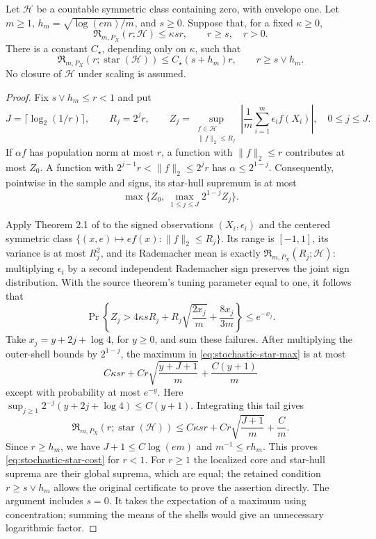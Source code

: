 \begin{lemma}
\label{lem:stochastic-star-cost}
Let $\mathcal H$ be a countable symmetric class containing zero, with
envelope one. Let $m\ge1$, $h_m=\sqrt{\log(em)/m}$, and $s\ge0$.
Suppose that, for a fixed $\kappa\ge0$,
\[
 \mathfrak R_{m,P_X}(r;\mathcal H)\le\kappa sr,
 \qquad r\ge s,\quad r>0.
\]
There is a constant $C_\star$, depending only on $\kappa$, such that
\begin{equation}
 \mathfrak R_{m,P_X}(r;\operatorname{star}(\mathcal H))
 \le C_\star(s+h_m)r,
 \qquad r\ge s\vee h_m.
 \label{eq:stochastic-star-cost}
\end{equation}
No closure of $\mathcal H$ under scaling is assumed.
\end{lemma}
\begin{proof}
Fix $s\vee h_m\le r<1$ and put
\[
 J=\lceil\log_2(1/r)\rceil,\qquad R_j=2^jr,
 \qquad
 Z_j=\sup_{\substack{f\in\mathcal H\\\|f\|_2\le R_j}}
 \left|\frac1m\sum_{i=1}^m\epsilon_i f(X_i)\right|,
 \quad 0\le j\le J.
\]
If $\alpha f$ has population norm at most $r$, a function with
$\|f\|_2\le r$ contributes at most $Z_0$. A function with
$2^{j-1}r<\|f\|_2\le2^jr$ has $\alpha\le2^{1-j}$.
Consequently, pointwise in the sample and signs, its star-hull
supremum is at most
\begin{equation}
 \max\{Z_0,\ \max_{1\le j\le J}2^{1-j}Z_j\}.
 \label{eq:stochastic-star-max}
\end{equation}

Apply Theorem 2.1 of \citet{bartlett2005local} to the signed
observations $(X_i,\epsilon_i)$ and the centered symmetric class
$\{(x,e)\mapsto ef(x):\|f\|_2\le R_j\}$. Its range is
$[-1,1]$, its variance is at most $R_j^2$, and its Rademacher mean
is exactly $\mathfrak R_{m,P_X}(R_j;\mathcal H)$: multiplying
$\epsilon_i$ by a second independent Rademacher sign preserves the
joint sign distribution. With the source theorem's tuning parameter
equal to one, it follows that
\[
 \Pr\left\{Z_j>4\kappa sR_j+
 R_j\sqrt{\frac{2x_j}{m}}+\frac{8x_j}{3m}\right\}
 \le e^{-x_j}.
\]
Take $x_j=y+2j+\log4$, for $y\ge0$, and sum these failures.
After multiplying the outer-shell bounds by $2^{1-j}$, the maximum
in \eqref{eq:stochastic-star-max} is at most
\[
 C\kappa sr+
 Cr\sqrt{\frac{y+J+1}{m}}+\frac{C(y+1)}m
\]
except with probability at most $e^{-y}$. Here
$\sup_{j\ge1}2^{-j}(y+2j+\log4)\le C(y+1)$.
Integrating this tail gives
\[
 \mathfrak R_{m,P_X}(r;\operatorname{star}(\mathcal H))
 \le C\kappa sr+Cr\sqrt{\frac{J+1}{m}}+\frac Cm.
\]
Since $r\ge h_m$, we have $J+1\le C\log(em)$ and
$m^{-1}\le rh_m$. This proves
\eqref{eq:stochastic-star-cost} for $r<1$. For $r\ge1$ the
localized core and star-hull suprema are their global suprema, which
are equal; the retained condition $r\ge s\vee h_m$ allows the
original certificate to prove the assertion directly.
The argument includes $s=0$. It takes the expectation of a maximum
using concentration; summing the means of the shells would give an
unnecessary logarithmic factor.
\end{proof}

